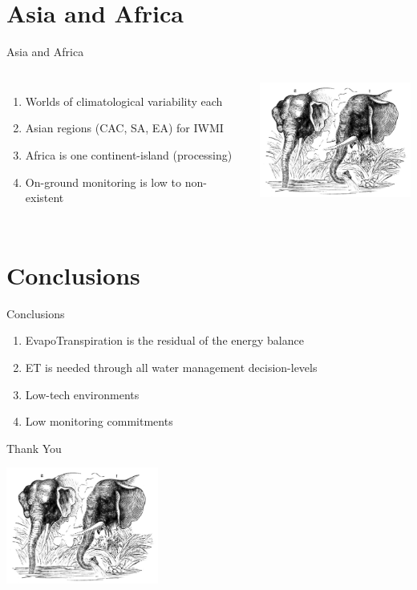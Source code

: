 \documentclass[xcolor=dvipsnames,beamer]{beamer} %
\begin{document}
\section{Asia and Africa}
\begin{frame}[fragile]{Asia and Africa}

\begin{columns}[l]
\begin{enumerate}
 \item Worlds of climatological variability each
 \item Asian regions (CAC, SA, EA) for IWMI
 \item Africa is one continent-island (processing)
 \item On-ground monitoring is low to non-existent
\end{enumerate}



\begin{center}
 \includegraphics[width=5cm]{elephants}
\end{center}
\end{columns}

\end{frame}

\section{Conclusions}
\begin{frame}[fragile]{Conclusions}

\begin{enumerate}
 \item EvapoTranspiration is the residual of the energy balance
 \item ET is needed through all water management decision-levels
 \item Low-tech environments
 \item Low monitoring commitments
\end{enumerate}

\end{frame}

\begin{frame}[fragile]{Thank You}

\begin{center}
 \includegraphics[width=5cm]{elephants}
\end{center}

\end{frame}
\end{document}
